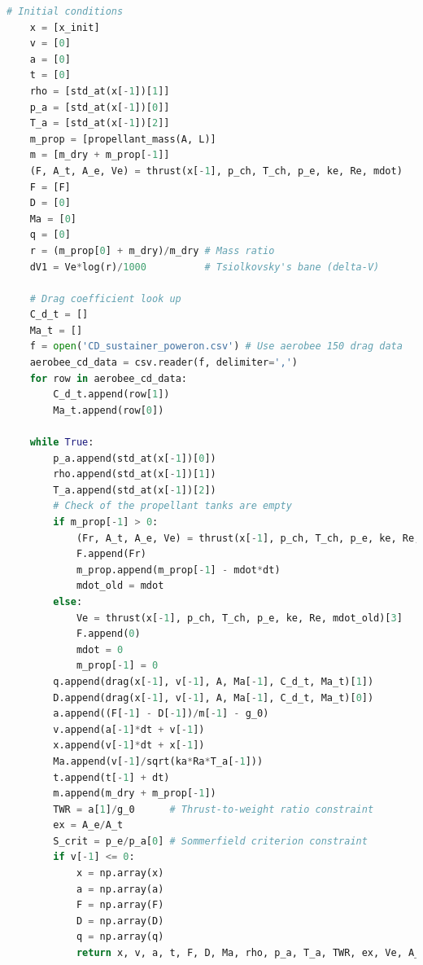 \documentclass[]{aiaa-tc}%
\begin{document}
\begin{lstlisting}[language=Python]
    # Initial conditions
    x = [x_init]
    v = [0]
    a = [0]
    t = [0]
    rho = [std_at(x[-1])[1]]
    p_a = [std_at(x[-1])[0]]
    T_a = [std_at(x[-1])[2]]
    m_prop = [propellant_mass(A, L)]
    m = [m_dry + m_prop[-1]]
    (F, A_t, A_e, Ve) = thrust(x[-1], p_ch, T_ch, p_e, ke, Re, mdot)
    F = [F]
    D = [0]
    Ma = [0]
    q = [0]
    r = (m_prop[0] + m_dry)/m_dry # Mass ratio
    dV1 = Ve*log(r)/1000          # Tsiolkovsky's bane (delta-V)
    
    # Drag coefficient look up
    C_d_t = []
    Ma_t = []
    f = open('CD_sustainer_poweron.csv') # Use aerobee 150 drag data
    aerobee_cd_data = csv.reader(f, delimiter=',')
    for row in aerobee_cd_data:
        C_d_t.append(row[1])
        Ma_t.append(row[0])

    while True:
        p_a.append(std_at(x[-1])[0])
        rho.append(std_at(x[-1])[1])
        T_a.append(std_at(x[-1])[2])
        # Check of the propellant tanks are empty
        if m_prop[-1] > 0:
            (Fr, A_t, A_e, Ve) = thrust(x[-1], p_ch, T_ch, p_e, ke, Re, mdot)
            F.append(Fr)
            m_prop.append(m_prop[-1] - mdot*dt)
            mdot_old = mdot
        else:
            Ve = thrust(x[-1], p_ch, T_ch, p_e, ke, Re, mdot_old)[3]
            F.append(0)
            mdot = 0
            m_prop[-1] = 0
        q.append(drag(x[-1], v[-1], A, Ma[-1], C_d_t, Ma_t)[1])
        D.append(drag(x[-1], v[-1], A, Ma[-1], C_d_t, Ma_t)[0])
        a.append((F[-1] - D[-1])/m[-1] - g_0)
        v.append(a[-1]*dt + v[-1])
        x.append(v[-1]*dt + x[-1]) 
        Ma.append(v[-1]/sqrt(ka*Ra*T_a[-1]))
        t.append(t[-1] + dt)
        m.append(m_dry + m_prop[-1])
        TWR = a[1]/g_0      # Thrust-to-weight ratio constraint
        ex = A_e/A_t
        S_crit = p_e/p_a[0] # Sommerfield criterion constraint
        if v[-1] <= 0:
            x = np.array(x)
            a = np.array(a)
            F = np.array(F)
            D = np.array(D)
            q = np.array(q)
            return x, v, a, t, F, D, Ma, rho, p_a, T_a, TWR, ex, Ve, A_t, dV1, m, S_crit, q, m_prop
\end{lstlisting}
\end{document}
